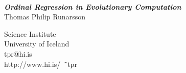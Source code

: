 
\begin{center}
\colorbox{qmuldarkblue}
{
 \color{white}

 \parbox{1.0\textwidth}
 {
  \parbox{0.24\textwidth}
  {
   \begin{center}
   \\[1ex]
   \end{center}
  }
  \parbox{0.5\textwidth}
  {
   \vspace{1cm}
   \begin{center}
   \textrm
   {
    {\veryHuge \bf \em Ordinal Regression in Evolutionary Computation}\\[1ex]
    {\huge       Thomas Philip Runarsson}
   }    
   \end{center}
   \vspace{1cm}
  }
  \parbox{0.24\textwidth}
  {
   \begin{center}
    {\huge Science Institute\\University of Iceland}\\[1ex]
   \textrm
   {
    \Large
    tpr@hi.is\\
    http://www.hi.is/\ \~\ tpr\\
   }
   \end{center}
  }
 }
}
\end{center}
